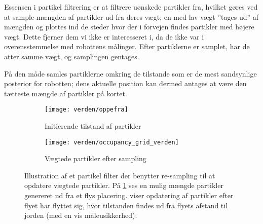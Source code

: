 Essensen i partikel filtrering er at filtrere uønskede partikler fra, hvilket gøres ved at sample mængden af partikler ud fra deres vægt; en med lav vægt ''tages ud'' af mængden og plottes ind de steder hvor der i forvejen findes partikler med højere vægt.
Dette fjerner dem vi ikke er interesseret i, da de ikke var i overensstemmelse med robottens målinger.
Efter partiklerne er samplet, har de atter samme vægt, og samplingen gentages.

På den måde samles partiklerne omkring de tilstande som er de mest sandsynlige posterior for robotten; dens aktuelle position kan dermed antages at være den tætteste mængde af partikler på kortet.

\begin{figure}[h] %
\centering
	\begin{subfigure}[b]{.45\textwidth}
	\centering
	\texttt{[image: verden/oppefra]}
	\caption{Initierende tilstand af partikler}
	\label{map:particles1}
	\end{subfigure}
	\begin{subfigure}[b]{.45\textwidth}
	\centering
	\texttt{[image: verden/occupancy\_grid\_verden]}
	\caption{Vægtede partikler efter sampling}
	\label{map:particles2}
	\end{subfigure}
\caption{Illustration af et partikel filter der benytter re-sampling til at opdatere vægtede partikler. 
På \cref{map:particles1} ses en mulig mængde partikler genereret ud fra et flys placering.
 viser opdatering af partikler efter flyet har flyttet sig, hvor tilstanden findes ud fra flyets afstand til jorden (med en vis måleusikkerhed).
}
\label{map:particles}
\end{figure}

